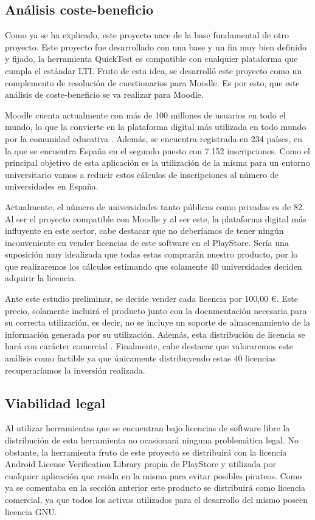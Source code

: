 \subsection{Análisis coste-beneficio}

Como ya se ha explicado, este proyecto nace de la base fundamental de otro proyecto. Este proyecto fue desarrollado con una base y un fin muy bien definido y fijado, la herramienta QuickTest es compatible con cualquier plataforma que cumpla el estándar LTI. Fruto de esta idea, se desarrolló este proyecto como un complemento de resolución de cuestionarios para Moodle. Es por esto, que este análisis de coste-beneficio se va realizar para Moodle.


Moodle cuenta actualmente con más de 100 millones de usuarios en todo el mundo, lo que la convierte en la plataforma digital más utilizada en todo mundo por la comunidad educativa \cite{wiki:mest} \cite{wiki:moodlestas}. Además, se encuentra registrada en 234 países, en la que se encuentra España en el segundo puesto con 7.152 inscripciones.
Como el principal objetivo de esta aplicación es la utilización de la misma para un entorno universitario vamos a reducir estos cálculos de inscripciones al número de universidades en España. 


Actualmente, el número de universidades tanto públicas como privadas es de 82. 
Al ser el proyecto compatible con Moodle y al ser este, la plataforma digital más influyente en este sector, cabe destacar que no deberíamos de tener ningún inconveniente en vender licencias de este software en el PlayStore. Sería una suposición muy idealizada que todas estas comprarán nuestro producto, por lo que realizaremos los cálculos estimando que solamente 40 universidades deciden adquirir la licencia.


Ante este estudio preliminar, se decide vender cada licencia por 100,00 \euro. Este precio, solamente incluirá el producto junto con la documentación necesaria para su correcta utilización, es decir, no se incluye un soporte de almacenamiento de la información generada por su utilización. Además, esta distribución de licencia se hará con carácter comercial \cite{wiki:liccom}. 
Finalmente, cabe destacar que valoraremos este análisis como factible ya que únicamente distribuyendo estas 40 licencias recuperaríamos la inversión realizada.



\subsection{Viabilidad legal}

Al utilizar herramientas que se encuentran bajo licencias de software libre la distribución de esta herramienta no ocasionará ninguna problemática legal.
No obstante, la herramienta fruto de este proyecto se distribuirá con la licencia Android License Verification Library \cite{wiki:androidlic} propia de PlayStore y utilizada por cualquier aplicación que resida en la misma para evitar posibles pirateos.
Como ya se comentaba en la sección anterior este producto se distribuirá como licencia comercial, ya que todos los activos utilizados para el desarrollo del mismo poseen licencia GNU.



